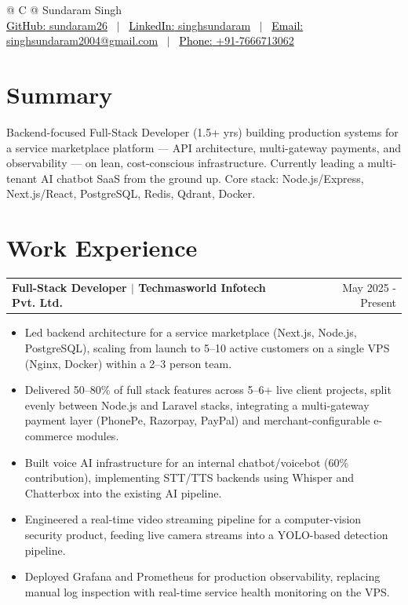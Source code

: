\documentclass[a4paper,10pt]{article}
\makeatletter
\newenvironment{joblong}[2]
    {
    \begin{tabularx}{\linewidth}{@{}l X r@{}}
    \textbf{#1} & \hfill &  #2 \\[1pt]
    \end{tabularx}
    \begin{minipage}[t]{\linewidth}
    \begin{itemize}[nosep,after=\strut, leftmargin=1em, itemsep=0pt,topsep=0pt]
    }
    {
    \end{itemize}
    \end{minipage}    
    }
\makeatother
\begin{document}
\renewcommand{\arraystretch}{0.85}
\linespread{0.94}
\pagestyle{empty} 

\begin{tabularx}{\linewidth}{@{} C @{}}
\huge{Sundaram Singh} \\[4pt]
\href{https://github.com/sundaram26}{\textcolor{black}{GitHub:} sundaram26} \ $|$ \ 
\href{https://linkedin.com/in/singhsundaram}{\textcolor{black}{LinkedIn:} singhsundaram} \ $|$ \ 
\href{mailto:singhsundaram2004@gmail.com}{\textcolor{black}{Email:} singhsundaram2004@gmail.com} \ $|$ \ 
\href{tel:+917666713062}{\textcolor{black}{Phone:} +91-7666713062} \\
\end{tabularx}

\vspace{1pt}
\section{Summary}
Backend-focused Full-Stack Developer (1.5+ yrs) building production systems for a service marketplace platform --- API architecture, multi-gateway payments, and observability --- on lean, cost-conscious infrastructure. Currently leading a multi-tenant AI chatbot SaaS from the ground up. Core stack: Node.js/Express, Next.js/React, PostgreSQL, Redis, Qdrant, Docker.

\section{Work Experience}

\begin{joblong}{Full-Stack Developer $|$ Techmasworld Infotech Pvt. Ltd.}{May 2025 - Present}
\item Led backend architecture for a service marketplace (Next.js, Node.js, PostgreSQL), scaling from launch to 5–10 active customers on a single VPS (Nginx, Docker) within a 2–3 person team.
\item Delivered 50–80\% of full stack features across 5–6+ live client projects, split evenly between Node.js and Laravel stacks, integrating a multi-gateway payment layer (PhonePe, Razorpay, PayPal) and merchant-configurable e-commerce modules.
\item Built voice AI infrastructure for an internal chatbot/voicebot (60\% contribution), implementing STT/TTS backends using Whisper and Chatterbox into the existing AI pipeline.
\item Engineered a real-time video streaming pipeline for a computer-vision security product, feeding live camera streams into a YOLO-based detection pipeline.
\item Deployed Grafana and Prometheus for production observability, replacing manual log inspection with real-time service health monitoring on the VPS.
\end{joblong}
  
\end{document}
